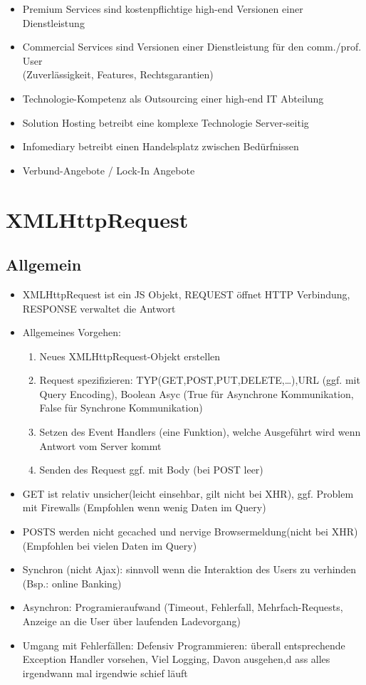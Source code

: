\documentclass{article} %
\begin{document}
			\begin{itemize}
				\item Premium Services sind kostenpflichtige high-end Versionen einer Dienstleistung
				\item Commercial Services sind Versionen einer Dienstleistung für den comm./prof. User\\
				(Zuverlässigkeit, Features, Rechtsgarantien)
				\item Technologie-Kompetenz als Outsourcing einer high-end IT Abteilung
				\item Solution Hosting betreibt eine komplexe Technologie Server-seitig
				\item Infomediary betreibt einen Handelsplatz zwischen Bedürfnissen
				\item Verbund-Angebote / Lock-In Angebote
			\end{itemize}
			
			
			
			
	\section{XMLHttpRequest}
	\subsection{Allgemein}
	\begin{itemize}
		\item XMLHttpRequest ist ein JS Objekt, REQUEST öffnet HTTP Verbindung, RESPONSE verwaltet die Antwort
		\item Allgemeines Vorgehen:
		\begin{enumerate}
			\item Neues XMLHttpRequest-Objekt erstellen
			\item Request spezifizieren: TYP(GET,POST,PUT,DELETE,\dots),URL (ggf. mit Query Encoding), Boolean Asyc (True für Asynchrone Kommunikation, False für Synchrone Kommunikation)
			\item Setzen des Event Handlers (eine Funktion), welche Ausgeführt wird wenn Antwort vom Server kommt
			\item Senden des Request ggf. mit Body (bei POST leer)
		\end{enumerate}
		\item GET ist relativ unsicher(leicht einsehbar, gilt nicht bei XHR), ggf. Problem mit Firewalls (Empfohlen wenn wenig Daten im Query)
		\item POSTS werden nicht gecached und nervige Browsermeldung(nicht bei XHR) (Empfohlen bei vielen Daten im Query)
		\item Synchron (nicht Ajax): sinnvoll wenn die Interaktion des Users zu verhinden (Bsp.: online Banking)
		\item Asynchron: Programieraufwand (Timeout, Fehlerfall, Mehrfach-Requests, Anzeige an die User über laufenden Ladevorgang)
		\item Umgang mit Fehlerfällen: Defensiv Programmieren: überall entsprechende Exception Handler vorsehen, Viel Logging, Davon ausgehen,d ass alles irgendwann mal irgendwie schief läuft
	\end{itemize}
			
\end{document}
